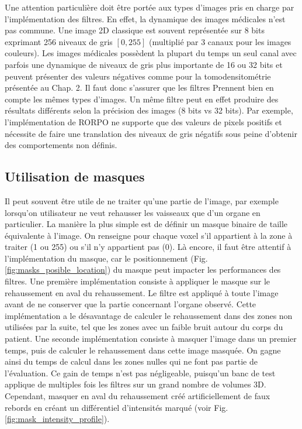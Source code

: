 Une attention particulière doit être portée aux types d'images pris en charge par l'implémentation des filtres. En effet, la dynamique des images médicales n'est pas commune. Une image 2D classique est souvent représentée sur 8 bits exprimant 256 niveaux de gris $[0,255]$ (multiplié par 3 canaux pour les images couleurs). Les images médicales possèdent la plupart du temps un seul canal avec parfois une dynamique de niveaux de gris plus importante de 16 ou 32 bits et peuvent présenter des valeurs négatives comme pour la tomodensitométrie présentée au Chap. 2. Il faut donc s'assurer que les filtres Prennent bien en compte les mêmes types d’images. Un même filtre peut en effet produire des résultats différents selon la précision des images (8 bits vs 32 bits). Par exemple, l'implémentation de RORPO ne supporte que des valeurs de pixels positifs et nécessite de faire une translation des niveaux de gris négatifs sous peine d'obtenir des comportements non définis.

\subsection{Utilisation de masques}

Il peut souvent être utile de ne traiter qu'une partie de l'image, par exemple lorsqu'on utilisateur ne veut rehausser les vaisseaux que d'un organe en particulier. La manière la plus simple est de définir un masque binaire de taille équivalente à l'image. On renseigne pour chaque voxel s'il appartient à la zone à traiter (1 ou 255) ou s'il n'y appartient pas (0). Là encore, il faut être attentif à l'implémentation du masque, car le positionnement (Fig. \ref{fig:masks_posible_location}) du masque peut impacter les performances des filtres. Une première implémentation consiste à appliquer le masque sur le rehaussement en aval du rehaussement. Le filtre est appliqué à toute l'image avant de ne conserver que la partie concernant l'organe observé. Cette implémentation a le désavantage de calculer le rehaussement dans des zones non utilisées par la suite, tel que les zones avec un faible bruit autour du corps du patient. Une seconde implémentation consiste à masquer l'image dans un premier temps, puis de calculer le rehaussement dans cette image masquée. On gagne ainsi du temps de calcul dans les zones nulles qui ne font pas partie de l'évaluation. Ce gain de temps n'est pas négligeable, puisqu'un banc de test applique de multiples fois les filtres sur un grand nombre de volumes 3D. Cependant, masquer en aval du rehaussement créé artificiellement de faux rebords en créant un différentiel d'intensités marqué (voir Fig. \ref{fig:mask_intensity_profile}).
 
